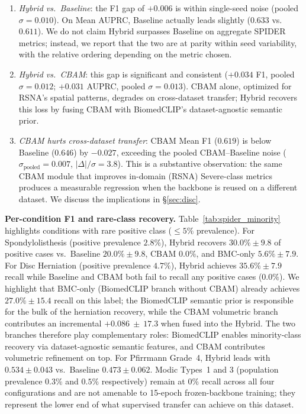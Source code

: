 \documentclass[runningheads]{llncs}
\begin{document}
\begin{enumerate}[leftmargin=*,topsep=0pt]
\item \emph{Hybrid vs.\ Baseline}: the F1 gap of $+0.006$ is within
single-seed noise (pooled $\sigma = 0.010$). On Mean AUPRC, Baseline
actually leads slightly ($0.633$ vs.\ $0.611$). We do not claim
Hybrid surpasses Baseline on aggregate SPIDER metrics; instead, we
report that the two are at parity within seed variability, with the
relative ordering depending on the metric chosen.

\item \emph{Hybrid vs.\ CBAM}: this gap is significant and consistent
($+0.034$ F1, pooled $\sigma = 0.012$; $+0.031$ AUPRC, pooled
$\sigma = 0.013$). CBAM alone, optimized for RSNA's spatial patterns,
degrades on cross-dataset transfer; Hybrid recovers this loss by
fusing CBAM with BiomedCLIP's dataset-agnostic semantic prior.

\item \emph{CBAM hurts cross-dataset transfer}: CBAM Mean F1
($0.619$) is below Baseline ($0.646$) by $-0.027$, exceeding the
pooled CBAM--Baseline noise ($\sigma_{\text{pooled}} = 0.007$,
$|\Delta|/\sigma = 3.8$). This is a substantive
observation: the same CBAM module that improves in-domain (RSNA)
Severe-class metrics produces a measurable regression when the
backbone is reused on a different dataset. We discuss the implications
in \S\ref{sec:disc}.
\end{enumerate}

\textbf{Per-condition F1 and rare-class recovery.}
Table~\ref{tab:spider_minority} highlights conditions with rare
positive class ($\leq 5\%$ prevalence). For Spondylolisthesis
(positive prevalence $2.8\%$), Hybrid recovers $30.0\% \pm 9.8$ of
positive cases vs.\ Baseline $20.0\% \pm 9.8$, CBAM $0.0\%$, and
BMC-only $5.6\% \pm 7.9$. For Disc Herniation (positive prevalence
$4.7\%$), Hybrid achieves $35.6\% \pm 7.9$ recall while Baseline and
CBAM both fail to recall any positive cases ($0.0\%$). We highlight
that BMC-only (BiomedCLIP branch without CBAM) already achieves
$27.0\% \pm 15.4$ recall on this label; the BiomedCLIP semantic
prior is responsible for the bulk of the herniation recovery, while
the CBAM volumetric branch contributes an incremental
$+0.086~\pm~17.3$ when fused into the Hybrid. The two branches
therefore play complementary roles: BiomedCLIP enables minority-class
recovery via dataset-agnostic semantic features, and CBAM contributes
volumetric refinement on top. For Pfirrmann
Grade~4, Hybrid leads with $0.534 \pm 0.043$ vs.\ Baseline
$0.473 \pm 0.062$. Modic Types~1 and 3 (population prevalence $0.3\%$
and $0.5\%$ respectively) remain at $0\%$ recall across all four
configurations and are not amenable to 15-epoch frozen-backbone
training; they represent the lower end of what supervised transfer
can achieve on this dataset.
\end{document}
